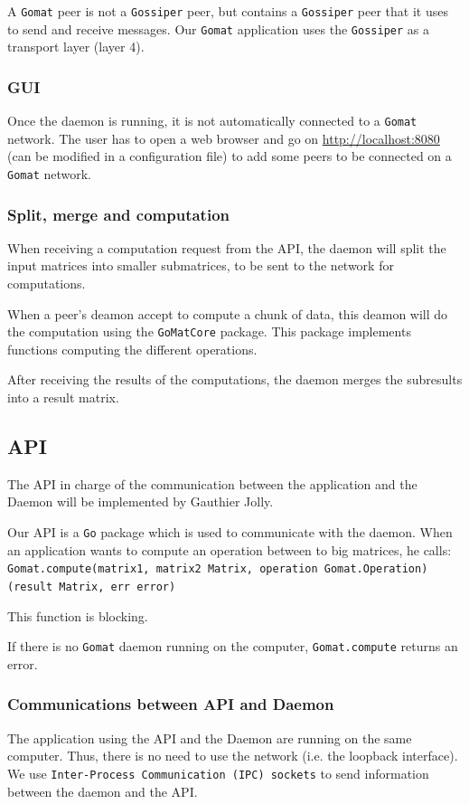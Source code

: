 \documentclass[a4paper,12pt]{article}
\newcommand{\Gossiper}{\texttt{Gossiper}\xspace}
\newcommand{\Gomat}{\texttt{Gomat}\xspace}
\newcommand{\Go}{\texttt{Go}\xspace}
\begin{document}
        A \Gomat peer is not a \Gossiper peer, but contains a \Gossiper peer that it uses to send and receive messages. Our \Gomat application uses the \Gossiper as a transport layer (layer 4).

        \subsubsection{GUI}
        Once the daemon is running, it is not automatically connected to a \Gomat network. The user has to open a web browser and go on \url{http://localhost:8080} (can be modified in a configuration file) to add some peers to be connected on a
    \Gomat network.

    \subsubsection{Split, merge and computation}
    When receiving a computation request from the API, the daemon will split the input matrices into smaller submatrices, to be sent to the network for computations.

    When a peer's deamon accept to compute a chunk of data, this deamon will do the computation using the \texttt{GoMatCore} package. This package implements functions computing the different operations.

    After receiving the results of the computations, the daemon merges the subresults into a result matrix.

    \subsection{API}
    The API in charge of the communication between the application and the Daemon will be implemented by Gauthier Jolly.

    Our API is a \Go package which is used to communicate with the daemon. When an application wants to compute an operation between to big matrices, he calls:\\
    \texttt{Gomat.compute(matrix1, matrix2 Matrix, operation Gomat.Operation) (result Matrix, err error)}


    This function is blocking.

    If there is no \Gomat daemon running on the computer, \texttt{Gomat.compute} returns an error.

        \subsubsection{Communications between API and Daemon}
    The application using the API and the Daemon are running on the same computer. Thus, there is no need to use the network (i.e. the loopback interface).
    We use \texttt{Inter-Process Communication (IPC) sockets} to send information between the daemon and the API.
\end{document}
